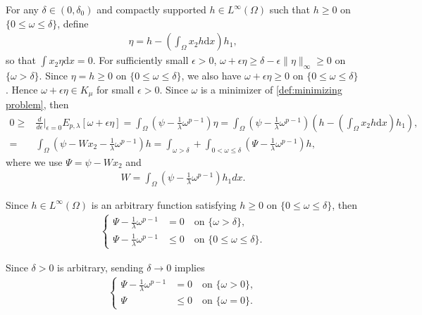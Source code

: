 \documentclass[11pt,letterpaper]{amsart}
\theoremstyle{definition}
\theoremstyle{remark}
\newcommand{\eps}{\epsilon}
\numberwithin{equation}{section}
\begin{document}
For any $\delta \in (0, \delta_{0})$ and compactly supported $h \in L^{\infty}(\Omega)$ such that $h \geq 0$ on $\{0 \leq \omega \leq \delta \}$, define
\begin{align*}
    \eta = h - \left(\int_{\Omega}x_2h\mathrm{d}x\right)h_{1},
\end{align*}
so that $\int x_{2}\eta \mathrm{d} x = 0$. For sufficiently small $\eps>0$, $\omega+\epsilon\eta\geq \delta-\epsilon\|\eta\|_{\infty}\geq 0$ on $\{\omega > \delta \}$. Since $\eta = h\geq 0$ on $\{0\leq \omega\leq \delta\}$, we also have $\omega+\epsilon\eta\geq 0 $ on $\{0\leq \omega\leq \delta\}$. Hence $\omega+\epsilon\eta\in K_\mu$ for small $\eps>0$. Since $\omega$ is a minimizer of \eqref{def:minimizing problem}, then
\begin{align*}
    0\geq & \frac{d}{d\eps}\Bigg|_{\eps=0}E_{p,\lambda}[\omega+\eps\eta] = \int_{\Omega}\left(\psi-\frac{1}{\lambda}\omega^{p-1}\right)\eta = \int_{\Omega}\left(\psi-\frac{1}{\lambda}\omega^{p-1}\right)\left(h - \left(\int_{\Omega}x_2h\mathrm{d}x\right)h_{1}\right), \\
    = & \int_{\Omega}\left(\psi-Wx_2-\frac{1}{\lambda}\omega^{p-1}\right)h = \int_{\omega>\delta}+\int_{0< \omega \leq \delta}\left( \Psi-\frac{1}{\lambda}\omega^{p-1} \right)h,
\end{align*}
where we use $\Psi=\psi-W x_2$ and
\begin{align*}
    W=\int_{\Omega}\left(\psi-\frac{1}{\lambda}\omega^{p-1}\right)h_1 dx.
\end{align*}

Since $h \in L^{\infty}(\Omega)$ is an arbitrary function satisfying $h \geq 0$ on $\{0 \leq \omega \leq \delta\}$, then 
\begin{align}
    \left\{\begin{aligned}
        \Psi - \frac{1}{\lambda}\omega^{p-1} & = 0 \quad \text{on } \{\omega > \delta\}, \\
        \Psi -  \frac{1}{\lambda}\omega^{p-1} & \leq 0 \quad \text{on } \{ 0 \leq \omega \leq  \delta\}. 
    \end{aligned}\right.
    \label{eqn:Psi and omega with para delta without L1}
\end{align}

Since $\delta>0$ is arbitrary, sending $\delta \rightarrow 0$ implies
\begin{align}
    \left\{\begin{aligned}
    \Psi - \frac{1}{\lambda}\omega^{p-1} & = 0 \quad \text{on } \{\omega > 0\}, \\
    \Psi & \leq 0 \quad \text{on } \{ \omega =0\}.
    \end{aligned}\right.
    \label{eqn:Psi and omega passing delta to 0 without L1}
\end{align}
\end{document}
